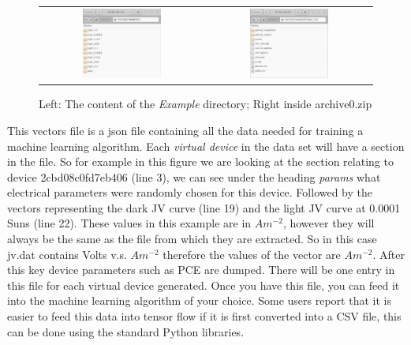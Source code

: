 \begin{figure}
\centering
\begin{tabular}{ c c }

\includegraphics[width=0.5\textwidth,height=0.4\textwidth]{./images/ml/archive_sims.png}

&
\includegraphics[width=0.5\textwidth,height=0.4\textwidth]{./images/ml/archive_sim.png}
\\
\end{tabular}
\caption{Left: The content of the \emph{Example} directory; Right inside archive0.zip}
\label{fig:ml_archive_sim}
\end{figure}

This vectors file is a json file containing all the data needed for training a machine learning algorithm. Each \emph{virtual device} in the data set will have a section in the file. So for example in this figure we are looking at the section relating to device 2cbd08c0fd7eb406 (line 3), we can see under the heading \emph{params} what electrical parameters were randomly chosen for this device. Followed by the vectors representing the dark JV curve (line 19) and the light JV curve at 0.0001 Suns (line 22). These values in this example are in $Am^{-2}$, however they will always be the same as the file from which they are extracted. So in this case jv.dat contains Volts v.s. $Am^{-2}$ therefore the values of the vector are $Am^{-2}$. After this key device parameters such as PCE are dumped. There will be one entry in this file for each virtual device generated. Once you have this file, you can feed it into the machine learning algorithm of your choice. Some users report that it is easier to feed this data into tensor flow if it is first converted into a CSV file, this can be done using the standard Python libraries.

